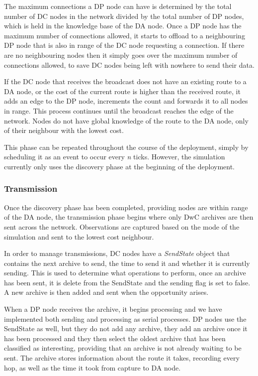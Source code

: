 	The maximum connections a DP node can have is determined by the total number of DC nodes in the network divided by the total number of DP nodes, which is held in the knowledge base of the DA node. Once a DP node has the maximum number of connections allowed, it starts to offload to a neighbouring DP node that is also in range of the DC node requesting a connection. If there are no neighbouring nodes then it simply goes over the maximum number of connections allowed, to save DC nodes being left with nowhere to send their data.
	
	If the DC node that receives the broadcast does not have an existing route to a DA node, or the cost of the current route is higher than the received route, it adds an edge to the DP node, increments the count and forwards it to all nodes in range. This process continues until the broadcast reaches the edge of the network. Nodes do not have global knowledge of the route to the DA node, only of their neighbour with the lowest cost.
	
	This phase can be repeated throughout the course of the deployment, simply by scheduling it as an event to occur every \textit{n} ticks. However, the simulation currently only uses the discovery phase at the beginning of the deployment.
	
\subsubsection{Transmission}
	Once the discovery phase has been completed, providing nodes are within range of the DA node, the transmission phase begins where only DwC archives are then sent across the network. Observations are captured based on the mode of the simulation and sent to the lowest cost neighbour.
	
	In order to manage transmissions, DC nodes have a \textit{SendState} object that contains the next archive to send, the time to send it and whether it is currently sending. This is used to determine what operations to perform, once an archive has been sent, it is delete from the SendState and the sending flag is set to false. A new archive is then added and sent when the opportunity arises.
	
	When a DP node receives the archive, it begins processing and we have implemented both sending and processing as serial processes. DP nodes use the SendState as well, but they do not add any archive, they add an archive once it has been processed and they then select the oldest archive that has been classified as interesting, providing that an archive is not already waiting to be sent. The archive stores information about the route it takes, recording every hop, as well as the time it took from capture to DA node.
	
